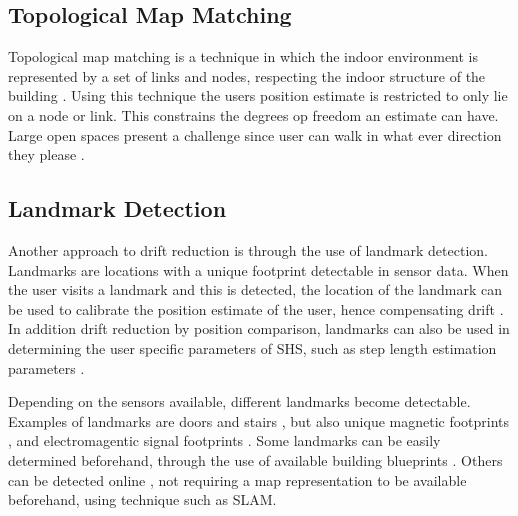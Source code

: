 \subsection*{Topological Map Matching}
Topological map matching is a technique in which the indoor environment is represented by a set of links and nodes, respecting the indoor structure of the building \cite{Davidson2017}. Using this technique the users position estimate is restricted to only lie on a node or link. This constrains the  degrees op freedom an estimate can have. Large open spaces present a challenge since user can walk in what ever direction they please \cite{Davidson2017}. 
%

\subsection*{Landmark Detection}
Another approach to drift reduction is through the use of landmark detection. Landmarks are locations with a unique footprint detectable in sensor data. When the user visits a landmark and this is detected, the location of the landmark can be used to calibrate the position estimate of the user, hence compensating drift \cite{Diaz2017}. In addition drift reduction by position comparison, landmarks can also be used in determining the user specific parameters of \ac{SHS}, such as step length estimation parameters \cite{Gu2019,Shang2015}. \par
Depending on the sensors available, different landmarks become detectable. Examples of landmarks are doors and stairs \cite{Diaz2017,Gu2019,Torok2014}, but also unique magnetic footprints \cite{MunozDiaz2019}, and electromagentic signal footprints \cite{Gu2019}. Some landmarks can be easily determined beforehand, through the use of available building blueprints \cite{Gu2019}. Others can be detected online \cite{Hardegger2012, Hardegger2016}, not requiring a map representation to be available beforehand, using technique such as \ac{SLAM}. 

